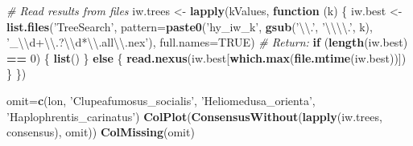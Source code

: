 \documentclass[]{book}
\newenvironment{Shaded}{\begin{snugshade}}{\end{snugshade}}
\newcommand{\KeywordTok}[1]{\textcolor[rgb]{0.13,0.29,0.53}{\textbf{#1}}}
\newcommand{\DataTypeTok}[1]{\textcolor[rgb]{0.13,0.29,0.53}{#1}}
\newcommand{\DecValTok}[1]{\textcolor[rgb]{0.00,0.00,0.81}{#1}}
\newcommand{\CharTok}[1]{\textcolor[rgb]{0.31,0.60,0.02}{#1}}
\newcommand{\StringTok}[1]{\textcolor[rgb]{0.31,0.60,0.02}{#1}}
\newcommand{\CommentTok}[1]{\textcolor[rgb]{0.56,0.35,0.01}{\textit{#1}}}
\newcommand{\OtherTok}[1]{\textcolor[rgb]{0.56,0.35,0.01}{#1}}
\newcommand{\ControlFlowTok}[1]{\textcolor[rgb]{0.13,0.29,0.53}{\textbf{#1}}}
\newcommand{\OperatorTok}[1]{\textcolor[rgb]{0.81,0.36,0.00}{\textbf{#1}}}
\newcommand{\NormalTok}[1]{#1}
\theoremstyle{definition}
\theoremstyle{definition}
\theoremstyle{definition}
\theoremstyle{remark}
\begin{document}
\begin{Shaded}
\begin{Highlighting}[]
\CommentTok{# Read results from files}
\NormalTok{iw.trees <-}\StringTok{ }\KeywordTok{lapply}\NormalTok{(kValues, }\ControlFlowTok{function}\NormalTok{ (k) \{}
\NormalTok{  iw.best <-}\StringTok{ }\KeywordTok{list.files}\NormalTok{(}\StringTok{'TreeSearch'}\NormalTok{, }
                      \DataTypeTok{pattern=}\KeywordTok{paste0}\NormalTok{(}\StringTok{'hy_iw_k'}\NormalTok{,}
                                     \KeywordTok{gsub}\NormalTok{(}\StringTok{'}\CharTok{\textbackslash{}\textbackslash{}}\StringTok{.'}\NormalTok{, }\StringTok{'}\CharTok{\textbackslash{}\textbackslash{}\textbackslash{}\textbackslash{}}\StringTok{.'}\NormalTok{, k),}
                                     \StringTok{'_}\CharTok{\textbackslash{}\textbackslash{}}\StringTok{d+}\CharTok{\textbackslash{}\textbackslash{}}\StringTok{.?}\CharTok{\textbackslash{}\textbackslash{}}\StringTok{d*}\CharTok{\textbackslash{}\textbackslash{}}\StringTok{.all}\CharTok{\textbackslash{}\textbackslash{}}\StringTok{.nex'}\NormalTok{),}
                      \DataTypeTok{full.names=}\OtherTok{TRUE}\NormalTok{)}
  \CommentTok{# Return:}
  \ControlFlowTok{if}\NormalTok{ (}\KeywordTok{length}\NormalTok{(iw.best) }\OperatorTok{==}\StringTok{ }\DecValTok{0}\NormalTok{) \{}
    \KeywordTok{list}\NormalTok{()}
\NormalTok{  \} }\ControlFlowTok{else}\NormalTok{ \{}
    \KeywordTok{read.nexus}\NormalTok{(iw.best[}\KeywordTok{which.max}\NormalTok{(}\KeywordTok{file.mtime}\NormalTok{(iw.best))])}
\NormalTok{  \}}
\NormalTok{\})}
\end{Highlighting}
\end{Shaded}

\begin{Shaded}
\begin{Highlighting}[]
\NormalTok{omit=}\KeywordTok{c}\NormalTok{(lon, }\StringTok{'Clupeafumosus_socialis'}\NormalTok{,}
       \StringTok{'Heliomedusa_orienta'}\NormalTok{, }\StringTok{'Haplophrentis_carinatus'}\NormalTok{)}
\KeywordTok{ColPlot}\NormalTok{(}\KeywordTok{ConsensusWithout}\NormalTok{(}\KeywordTok{lapply}\NormalTok{(iw.trees, consensus), omit))}
\KeywordTok{ColMissing}\NormalTok{(omit)}
\end{Highlighting}
\end{Shaded}
\end{document}
